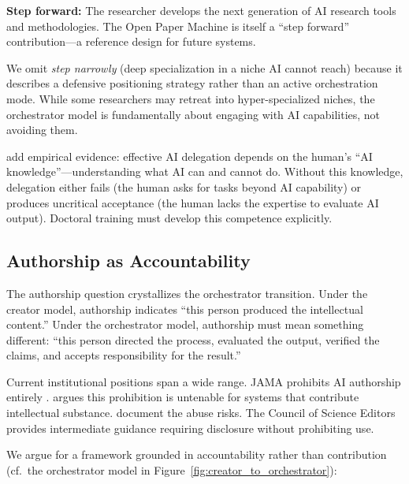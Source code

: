 \documentclass{article}
\begin{document}
\textbf{Step forward:} The researcher develops the next generation of AI research tools and methodologies. The Open Paper Machine is itself a ``step forward'' contribution---a reference design for future systems.

We omit \textit{step narrowly} (deep specialization in a niche AI cannot reach) because it describes a defensive positioning strategy rather than an active orchestration mode. While some researchers may retreat into hyper-specialized niches, the orchestrator model is fundamentally about engaging with AI capabilities, not avoiding them.

\citet{pinski2023delegation} add empirical evidence: effective AI delegation depends on the human's ``AI knowledge''---understanding what AI can and cannot do. Without this knowledge, delegation either fails (the human asks for tasks beyond AI capability) or produces uncritical acceptance (the human lacks the expertise to evaluate AI output). Doctoral training must develop this competence explicitly.

\subsection{Authorship as Accountability}

The authorship question crystallizes the orchestrator transition. Under the creator model, authorship indicates ``this person produced the intellectual content.'' Under the orchestrator model, authorship must mean something different: ``this person directed the process, evaluated the output, verified the claims, and accepts responsibility for the result.''

Current institutional positions span a wide range. JAMA prohibits AI authorship entirely \citep{flanagin2023nonhuman}. \citet{abernethy2025parrots} argues this prohibition is untenable for systems that contribute intellectual substance. \citet{kendall2024risks} document the abuse risks. The Council of Science Editors \citep{jackson2023cse} provides intermediate guidance requiring disclosure without prohibiting use.

We argue for a framework grounded in accountability rather than contribution (cf.\ the orchestrator model in Figure~\ref{fig:creator_to_orchestrator}):
\end{document}
